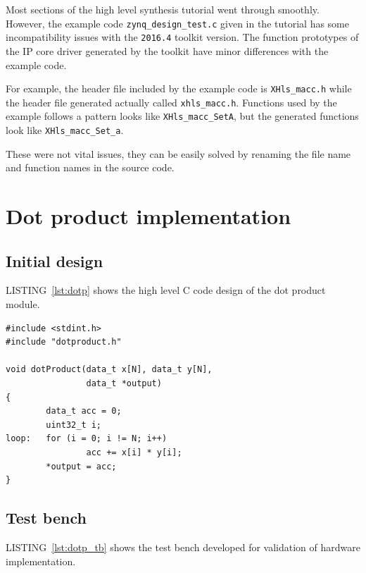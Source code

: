 \documentclass[journal]{IEEEtran}
\newcommand{\lref}[1]{LISTING~\ref{#1}}
\begin{document}
Most sections of the high level synthesis tutorial went through smoothly. However, the example code \texttt{zynq\_design\_test.c} given in the tutorial has some incompatibility issues with the \texttt{2016.4} toolkit version. The function prototypes of the IP core driver generated by the toolkit have minor differences with the example code.

For example, the header file included by the example code is \texttt{XHls\_macc.h} while the header file generated actually called \texttt{xhls\_macc.h}. Functions used by the example follows a pattern looks like \texttt{XHls\_macc\_SetA}, but the generated functions look like \texttt{XHls\_macc\_Set\_a}.

These were not vital issues, they can be easily solved by renaming the file name and function names in the source code.

\section{Dot product implementation}

\subsection{Initial design}

\lref{lst:dotp} shows the high level C code design of the dot product module.

\begin{lstlisting}[caption={High level synthesis design for dot product},captionpos=b,label=lst:dotp]
#include <stdint.h>
#include "dotproduct.h"

void dotProduct(data_t x[N], data_t y[N],
                data_t *output)
{
        data_t acc = 0;
        uint32_t i;
loop:   for (i = 0; i != N; i++)
                acc += x[i] * y[i];
        *output = acc;
}
\end{lstlisting}

\subsection{Test bench}

\lref{lst:dotp_tb} shows the test bench developed for validation of hardware implementation.
\end{document}
